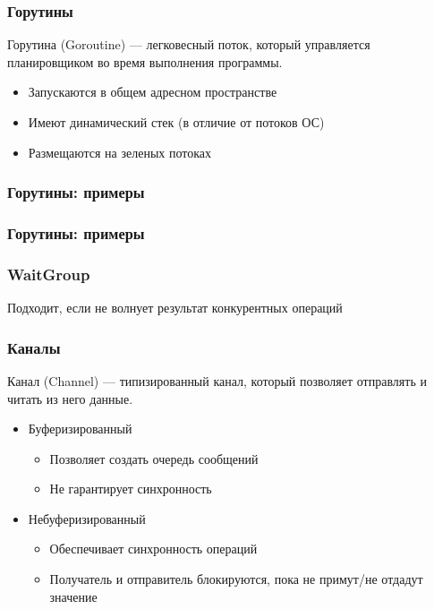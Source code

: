 \documentclass[aspectratio=169]{beamer}
\begin{document}
\begin{frame}[fragile]
  \frametitle{Горутины}
  
    Горутина (Goroutine) --- легковесный поток, который управляется планировщиком во время выполнения программы.

    \begin{itemize}
        \item Запускаются в общем адресном пространстве
        \item Имеют динамический стек (в отличие от потоков ОС)
        \item Размещаются на зеленых потоках
    \end{itemize}
  
\end{frame}

\begin{frame}[fragile]
  \frametitle{Горутины: примеры}
  
  
  
\end{frame}


\begin{frame}[fragile]
  \frametitle{Горутины: примеры}
  
  
  
\end{frame}

\begin{frame}[fragile]
  \frametitle{WaitGroup}
  
  Подходит, если не волнует результат конкурентных операций

  
  
\end{frame}


\begin{frame}[fragile]
	\frametitle{Каналы}
	  Канал (Channel) --- типизированный канал, который позволяет отправлять и читать из него данные.

    \begin{itemize}
      \item Буферизированный
      \begin{itemize}
        \item Позволяет создать очередь сообщений
        \item Не гарантирует синхронность
      \end{itemize}

      \item Небуферизированный

      \begin{itemize}
        \item Обеспечивает синхронность операций
        \item Получатель и отправитель блокируются, пока не примут/не отдадут значение
      \end{itemize}
    \end{itemize}
	
\end{frame}
\end{document}

